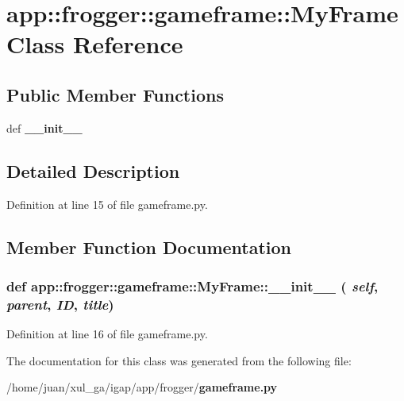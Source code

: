 \section{app::frogger::gameframe::MyFrame Class Reference}
\label{classapp_1_1frogger_1_1gameframe_1_1MyFrame}
\subsection*{Public Member Functions}
\begin{CompactItemize}
\item 
def {\bf \_\-\_\-init\_\-\_\-}
\end{CompactItemize}


\subsection{Detailed Description}


Definition at line 15 of file gameframe.py.

\subsection{Member Function Documentation}
\subsubsection{\setlength{\rightskip}{0pt plus 5cm}def app::frogger::gameframe::MyFrame::\_\-\_\-init\_\-\_\- ( {\em self},  {\em parent},  {\em ID},  {\em title})}\label{classapp_1_1frogger_1_1gameframe_1_1MyFrame_1f5b73fe2f6bef17e4b76a411f133fd1}




Definition at line 16 of file gameframe.py.

The documentation for this class was generated from the following file:\begin{CompactItemize}
\item 
/home/juan/xul\_\-ga/igap/app/frogger/{\bf gameframe.py}\end{CompactItemize}
